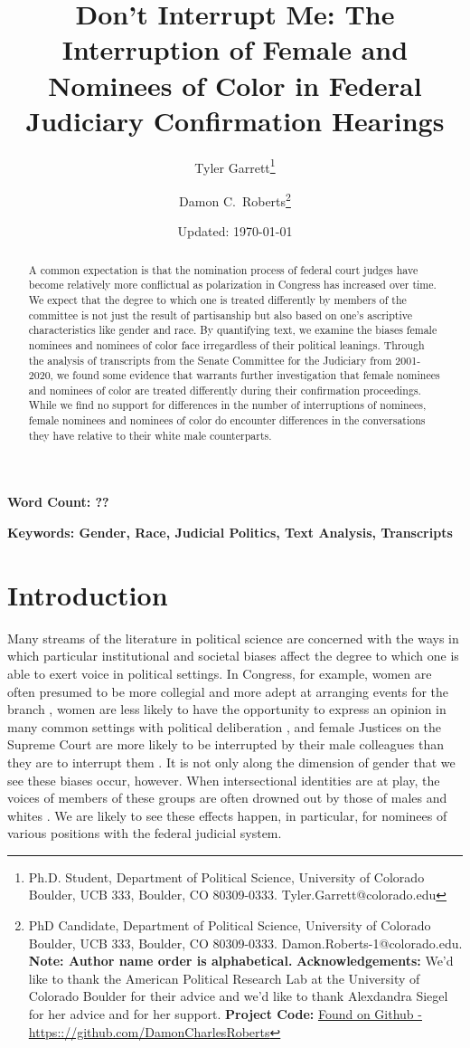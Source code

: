 \documentclass [12pt]{article}
\title{Don't Interrupt Me: The Interruption of Female and Nominees of Color in Federal Judiciary Confirmation Hearings}
\author{Tyler Garrett\footnote{Ph.D. Student, Department of Political Science, University of Colorado Boulder, UCB 333, Boulder, CO 80309-0333. Tyler.Garrett@colorado.edu} \and Damon C.\ Roberts\footnote{PhD Candidate,
		Department of Political Science, University of Colorado Boulder, UCB 333, Boulder, CO 80309-0333. Damon.Roberts-1@colorado.edu. \newline \textbf{Note: Author name order is alphabetical.} \newline \textbf{Acknowledgements:} We'd like to thank the American Political Research Lab at the University of Colorado Boulder for their advice and we'd like to thank Alexdandra Siegel for her advice and for her support. \newline \textbf{Project Code:} \href{https://github.com/DamonCharlesRoberts/judiciary_hearing_interruptions}{Found on Github - https:://github.com/DamonCharlesRoberts}}}
\date{Updated: \today}
\begin{document}
	\maketitle
	\begin{abstract}
A common expectation is that the nomination process of federal court judges have become relatively more conflictual as polarization in Congress has increased over time. We expect that the degree to which one is treated differently by members of the committee is not just the result of partisanship but also based on one's ascriptive characteristics like gender and race. By quantifying text, we examine the biases female nominees and nominees of color face irregardless of their political leanings. Through the analysis of transcripts from the Senate Committee for the Judiciary from 2001-2020, we found some evidence that warrants further investigation that female nominees and nominees of color are treated differently during their confirmation proceedings. While we find no support for differences in the number of interruptions of nominees, female nominees and nominees of color do encounter differences in the conversations they have relative to their white male counterparts.
	\end{abstract}
	
	\textbf{Word Count: ??} 
	
	\textbf{Keywords: Gender, Race, Judicial Politics, Text Analysis, Transcripts}

	\cleardoublepage
    \setcounter{page}{2}
	\newpage
	\doublespace
	\newpage 

\section{Introduction}
	
Many streams of the literature in political science are concerned with the ways in which particular institutional and societal biases affect the degree to which one is able to exert voice in political settings. In Congress, for example, women are often presumed to be more collegial and more adept at arranging events for the branch \citep{lawless_2018}, women are less likely to have the opportunity to express an opinion in many common settings with political deliberation  \citep{karpowitz_et-al_2012}, and female Justices on the Supreme Court are more likely to be interrupted by their male colleagues than they are to interrupt them \citep{jacobi_2017}. It is not only along the dimension of gender that we see these biases occur, however. When intersectional identities are at play, the voices of members of these groups are often drowned out by those of males and whites \citep[see][for example]{strolovitch_2006}. We are likely to see these effects happen, in particular, for nominees of various positions with the federal judicial system. 
\end{document}
